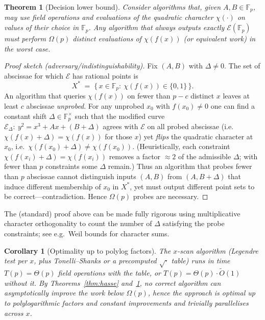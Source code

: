 \documentclass[11pt]{article}
\newtheorem{theorem}{Theorem}
\newtheorem{corollary}{Corollary}
\newcommand{\Fp}{\mathbb{F}_p}
\newcommand{\E}{\mathcal{E}}
\begin{document}
\begin{theorem}[Decision lower bound]\label{thm:decision}
Consider algorithms that, given $A,B\in\Fp$, may use field operations and evaluations of the quadratic character $\chi(\cdot)$ on values of their choice in $\Fp$.
Any algorithm that always outputs \emph{exactly} $\E(\Fp)$ must perform $\Omega(p)$ distinct evaluations of $\chi(f(x))$ (or equivalent work) in the worst case.
\end{theorem}

\begin{proof}[Proof sketch (adversary/indistinguishability)]
Fix $(A,B)$ with $\Delta\neq 0$. The set of abscissae for which $\E$ has rational points is
\[
  X^* \;=\; \{\,x\in\Fp:\ \chi(f(x))\in\{0,1\}\,\}.
\]
An algorithm that queries $\chi(f(x))$ on fewer than $p-c$ distinct $x$ leaves at least $c$ abscissae \emph{unprobed}.
For any unprobed $x_0$ with $f(x_0)\neq 0$ one can find a constant shift $\Delta\in\Fp^\times$ such that the modified curve
\(
  \E_\Delta:\ y^2=x^3+Ax+(B+\Delta)
\)
agrees with $\E$ on all probed abscissae (i.e.\ $\chi(f(x)+\Delta)=\chi(f(x))$ for those $x$) yet \emph{flips} the quadratic character at $x_0$, i.e.\ $\chi(f(x_0)+\Delta)\neq \chi(f(x_0))$.
(Heuristically, each constraint $\chi(f(x_i)+\Delta)=\chi(f(x_i))$ removes a factor $\approx 2$ of the admissible $\Delta$; with fewer than $p$ constraints some $\Delta$ remain.)
Thus an algorithm that probes fewer than $p$ abscissae cannot distinguish inputs $(A,B)$ from $(A,B+\Delta)$ that induce different membership of $x_0$ in $X^*$, yet must output different point sets to be correct—contradiction. Hence $\Omega(p)$ probes are necessary.
\end{proof}

\noindent
The (standard) proof above can be made fully rigorous using multiplicative character orthogonality to count the number of $\Delta$ satisfying the probe constraints; see e.g.\ Weil bounds for character sums.

\begin{corollary}[Optimality up to polylog factors]\label{cor:optimal}
The $x$-scan algorithm (Legendre test per $x$, plus Tonelli--Shanks or a precomputed $\sqrt{\cdot}$ table) runs in time $T(p)=\Theta(p)$ field operations with the table, or $T(p)=\Theta(p)\cdot\tilde O(1)$ without it.
By Theorems~\ref{thm:hasse} and~\ref{thm:decision}, no correct algorithm can asymptotically improve the \emph{work} below $\Omega(p)$, hence the approach is optimal up to polylogarithmic factors and constant improvements and trivially parallelises across $x$.
\end{corollary}
\end{document}
